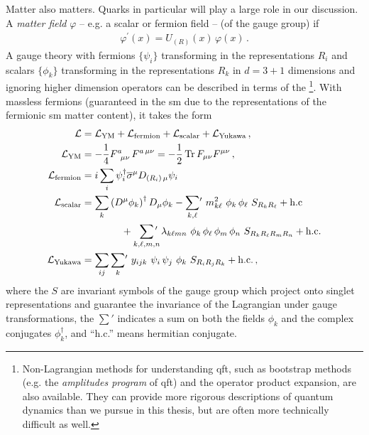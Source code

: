 Matter also matters.
%
Quarks in particular will play a large role in our discussion.
%
A \textit{matter field} \(\varphi\) -- e.g. a scalar or fermion field --  (of the gauge group) if
\begin{align}
    \varphi^\prime(x) = U_{(R)}(x) \, \varphi(x)
    \,.
\end{align}
%
A gauge theory with fermions \(\{\psi_{i}\}\) transforming in the representations \(R_i\) and scalars \(\{\phi_k\}\) transforming in the representations \(R_k\) in \(d=3+1\) dimensions and ignoring higher dimension operators can be described in terms of the %
\footnote{
    Non-Lagrangian methods for understanding \gls{qft}, such as bootstrap methods (e.g. the \textit{amplitudes program} of \gls{qft}) and the operator product expansion, are also available.
    They can provide more rigorous descriptions of quantum dynamics than we pursue in this thesis, but are often more technically difficult as well.
}.
%
With massless fermions (guaranteed in the \gls{sm} due to the representations of the fermionic \gls{sm} matter content), it takes the form
\begin{subequations}
    \label{eq:yang-mills-matter-lagrangian}
\begin{align}
    \mathcal{L}
    &=
    \mathcal{L}_\text{YM}
    +
    \mathcal{L}_\text{fermion}
    +
    \mathcal{L}_\text{scalar}
    +
    \mathcal{L}_\text{Yukawa}
    \,,
    \\
    \mathcal{L}_\text{YM}
    &=
    - \frac{1}{4} F\indices{^a_{\mu\nu}} F\indices{^{a\,\mu\nu}}
    =
    - \frac{1}{2} \Tr F_{\mu\nu} F^{\mu\nu}
    \,,
    \\
    \mathcal{L}_\text{fermion}
    &=
    i \sum_i \psi_i^\dagger \overline{\sigma}^\mu D_{(R_i)\,\mu} \psi_i
    \\
    \mathcal{L}_\text{scalar}
    &=
    \sum_k \le(D^\mu \phi_k\ri)^\dagger D_\mu \phi_k
    -
    \sum_{k,\ell} \! {}^\prime
    \,\,
    m_{k\ell}^2
    \,\,
    \phi_k \, \phi_\ell
    \,\,
    S_{R_k R_\ell}
    +
    \text{h.c}
    \\
    \notag
    &\qquad\qquad
    +
    \sum_{k,\ell,m,n} \!\!\!\! {}^\prime
    \,\,
    \lambda_{k\ell m n}
    \,\,
    \phi_k \, \phi_\ell \, \phi_m \, \phi_n
    \,\,
    S_{R_k R_\ell R_m R_n}
    +
    \text{h.c.}
    \\
    \mathcal{L}_\text{Yukawa}
    &=
    \sum_{ij}
    \sum_{k} \! {}^\prime
    \,\,
    y_{ijk}
    \,\,
    \psi_i \,\psi_j \,\, \phi_k
    \,\,
    S_{R_i R_j R_k}
    +
    \text{h.c.}
    \,,
\end{align}
\end{subequations}
where the \(S\) are invariant symbols of the gauge group which project onto singlet representations and guarantee the invariance of the Lagrangian under gauge transformations, the \(\sum'\) indicates a sum on both the fields \(\phi_k\) and the complex conjugates \(\phi_k^\dagger\), and ``h.c.'' means hermitian conjugate.

